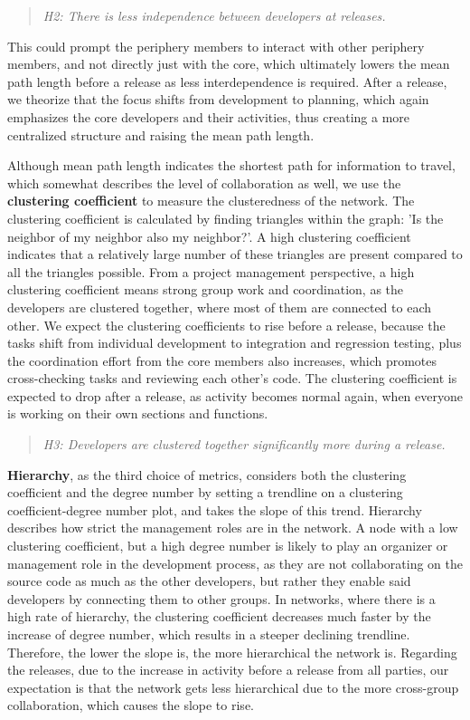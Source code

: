 \begin{quote}
    \textit{H2: There is less independence between developers at releases.}
\end{quote}

This could prompt the periphery members to interact with other periphery members, and not directly just with the core, which ultimately lowers the mean path length before a release as less interdependence is required. After a release, we theorize that the focus shifts from development to planning, which again emphasizes the core developers and their activities, thus creating a more centralized structure and raising the mean path length.

Although mean path length indicates the shortest path for information to travel, which somewhat describes the level of collaboration as well, we use the \textbf{clustering coefficient} to measure the clusteredness of the network. The clustering coefficient is calculated by finding triangles within the graph: 'Is the neighbor of my neighbor also my neighbor?'. A high clustering coefficient indicates that a relatively large number of these triangles are present compared to all the triangles possible. From a project management perspective, a high clustering coefficient means strong group work and coordination, as the developers are clustered together, where most of them are connected to each other. We expect the clustering coefficients to rise before a release, because the tasks shift from individual development to integration and regression testing, plus the coordination effort from the core members also increases, which promotes cross-checking tasks and reviewing each other's code. The clustering coefficient is expected to drop after a release, as activity becomes normal again, when everyone is working on their own sections and functions.


\begin{quote}
    \textit{H3: Developers are clustered together significantly more during a release.}
\end{quote}


\textbf{Hierarchy}, as the third choice of metrics, considers both the clustering coefficient and the degree number by setting a trendline on a clustering coefficient-degree number plot, and takes the slope of this trend. Hierarchy describes how strict the management roles are in the network. A node with a low clustering coefficient, but a high degree number is likely to play an organizer or management role in the development process, as they are not collaborating on the source code as much as the other developers, but rather they enable said developers by connecting them to other groups. In networks, where there is a high rate of hierarchy, the clustering coefficient decreases much faster by the increase of degree number, which results in a steeper declining trendline. Therefore, the lower the slope is, the more hierarchical the network is. Regarding the releases, due to the increase in activity before a release from all parties, our expectation is that the network gets less hierarchical due to the more cross-group collaboration, which causes the slope to rise. 

